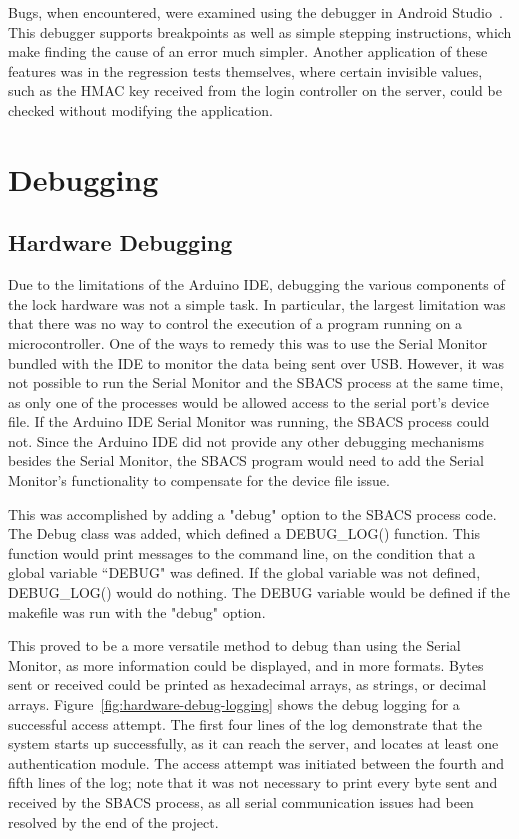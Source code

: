 \documentclass[12pt]{report}
\let\Oldsection\section
\renewcommand{\section}{\FloatBarrier\Oldsection}
\let\Oldsubsection\subsection
\renewcommand{\subsection}{\FloatBarrier\Oldsubsection}
\begin{document}
Bugs, when encountered, were examined using the debugger in Android Studio~\autocite{ANDROIDSTUDIO}. This debugger
supports breakpoints as well as simple stepping instructions, which make finding the cause of an error much simpler.
Another application of these features was in the regression tests themselves, where certain invisible values, such as
the HMAC key received from the login controller on the server, could be checked without modifying the application.

\section{Debugging} \label{sec:debugging}

\subsection{Hardware Debugging}

Due to the limitations of the Arduino IDE, debugging the various components of the lock hardware was not a simple task. 
In particular, the largest limitation was that there was no way to control the execution of a program running on a 
microcontroller. One of the ways to remedy this was to use the Serial Monitor bundled with the IDE to monitor the data 
being sent over USB. However, it was not possible to run the Serial Monitor and the SBACS process at the same time, as 
only one of the processes would be allowed access to the serial port's device file. If the Arduino IDE Serial Monitor 
was running, the SBACS process could not. Since the Arduino IDE did not provide any other debugging mechanisms besides 
the Serial Monitor, the SBACS program would need to add the Serial Monitor's functionality to compensate for the device 
file issue.

This was accomplished by adding a "debug" option to the SBACS process code. The Debug class was added, which defined a 
DEBUG\_LOG() function. This function would print messages to the command line, on the condition that a global variable 
``DEBUG" was defined. If the global variable was not defined, DEBUG\_LOG() would do nothing. The DEBUG variable would be 
defined if the makefile was run with the "debug" option.

This proved to be a more versatile method to debug than using the Serial Monitor, as more information could be 
displayed, and in more formats. Bytes sent or received could be printed as hexadecimal arrays, as strings, or decimal 
arrays. Figure~\ref{fig:hardware-debug-logging} shows the debug logging for a successful access attempt. The first four 
lines of the log demonstrate that the system starts up successfully, as it can reach the server, and locates at least 
one authentication module. The access attempt was initiated between the fourth and fifth lines of the log; note that it 
was not necessary to print every byte sent and received by the SBACS process, as all serial communication issues 
had been resolved by the end of the project.
\end{document}
